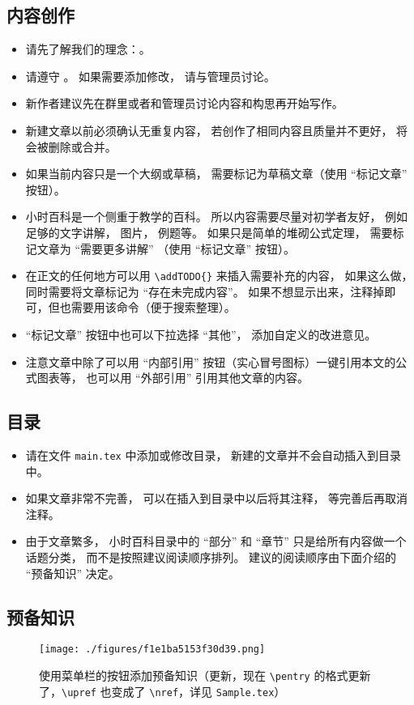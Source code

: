 
\subsection{内容创作}
\begin{itemize}
\item 请先了解我们的理念：。
\item 请遵守 。 如果需要添加修改， 请与管理员讨论。
\item 新作者建议先在群里或者和管理员讨论内容和构思再开始写作。
\item 新建文章以前必须确认无重复内容， 若创作了相同内容且质量并不更好， 将会被删除或合并。
\item 如果当前内容只是一个大纲或草稿， 需要标记为草稿文章（使用 “标记文章” 按钮）。
\item 小时百科是一个侧重于教学的百科。 所以内容需要尽量对初学者友好， 例如足够的文字讲解， 图片， 例题等。 如果只是简单的堆砌公式定理， 需要标记文章为 “需要更多讲解” （使用 “标记文章” 按钮）。
\item 在正文的任何地方可以用 \verb|\addTODO{}| 来插入需要补充的内容， 如果这么做， 同时需要将文章标记为 “存在未完成内容”。 如果不想显示出来，注释掉即可，但也需要用该命令（便于搜索整理）。
\item “标记文章” 按钮中也可以下拉选择 “其他”， 添加自定义的改进意见。
\item 注意文章中除了可以用 “内部引用” 按钮（实心冒号图标）一键引用本文的公式图表等， 也可以用 “外部引用” 引用其他文章的内容。
\end{itemize}

\subsection{目录}
\begin{itemize}
\item 请在文件 \verb|main.tex| 中添加或修改目录， 新建的文章并不会自动插入到目录中。
\item 如果文章非常不完善， 可以在插入到目录中以后将其注释， 等完善后再取消注释。
\item 由于文章繁多， 小时百科目录中的 “部分” 和 “章节” 只是给所有内容做一个话题分类， 而不是按照建议阅读顺序排列。 建议的阅读顺序由下面介绍的 “预备知识” 决定。
\end{itemize}

\subsection{预备知识}
\begin{figure}[ht]
\centering
\texttt{[image: ./figures/f1e1ba5153f30d39.png]}
\caption{使用菜单栏的按钮添加预备知识（更新，现在 \verb`\pentry` 的格式更新了，\verb`\upref` 也变成了 \verb`\nref`，详见 \verb`Sample.tex`）} \label{fig_WrGuid_1}
\end{figure}

